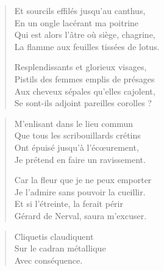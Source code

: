 \begin{textblock*}{8cm}
\begin{verse}
  Et sourcils effilés jusqu’au canthus,\\  %
  En un ongle lacérant ma poitrine\\  %
  Qui est alors l’âtre où siège, chagrine,\\  %
  La flamme aux feuilles tissées de lotus.

  Resplendissants et glorieux visages,\\  %
  Pistils des femmes emplis de présages\\  %
  Aux cheveux sépales qu’elles cajolent,\\  %
  Se sont-ils adjoint pareilles corolles ?
\end{verse}
\end{textblock*}



\begin{verse}\quatrain
  M’enlisant dans le lieu commun\\  %
  Que tous les scribouillards crétins\\  %
  Ont épuisé jusqu’à l’écœurement,\\  %
  Je prétend en faire un ravissement.  %

  Car la fleur que je ne peux emporter\\  %
  Je l’admire  sans pouvoir la cueillir.\\  %
  Et si l’étreinte,  la ferait périr\\  %
  Gérard de Nerval, saura m’excuser.  %
\end{verse}


\begin{verse}\haiku
  Cliquetis claudiquent\\  %
  Sur le cadran métallique\\  %
  Avec conséquence.
\end{verse}

